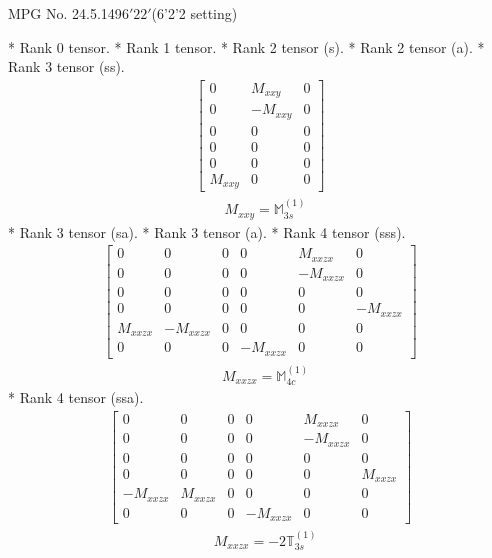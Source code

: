 \documentclass[fleqn,8pt,landscape]{jsarticle}
\begin{document}
\setcounter{MaxMatrixCols}{32}

\renewcommand{\tablename}{Table~}
\renewcommand{\figurename}{Figure~}
\begin{center}
\LARGE
MPG No. 24.5.149\quad$6'22'$\quad(6'2'2 setting)
\end{center}
* Rank 0 tensor.
* Rank 1 tensor.
* Rank 2 tensor (s).
* Rank 2 tensor (a).
* Rank 3 tensor (ss).
\begin{align*}
\begin{bmatrix} 0 & M_{xxy} & 0 \\ 0 & - M_{xxy} & 0 \\ 0 & 0 & 0 \\ 0 & 0 & 0 \\ 0 & 0 & 0 \\ M_{xxy} & 0 & 0 \end{bmatrix}
\end{align*}
\begin{align*}
& M_{xxy} = \mathbb{M}_{3s}^{(1)}
\end{align*}
* Rank 3 tensor (sa).
* Rank 3 tensor (a).
* Rank 4 tensor (sss).
\begin{align*}
\begin{bmatrix} 0 & 0 & 0 & 0 & M_{xxzx} & 0 \\ 0 & 0 & 0 & 0 & - M_{xxzx} & 0 \\ 0 & 0 & 0 & 0 & 0 & 0 \\ 0 & 0 & 0 & 0 & 0 & - M_{xxzx} \\ M_{xxzx} & - M_{xxzx} & 0 & 0 & 0 & 0 \\ 0 & 0 & 0 & - M_{xxzx} & 0 & 0 \end{bmatrix}
\end{align*}
\begin{align*}
& M_{xxzx} = \mathbb{M}_{4c}^{(1)}
\end{align*}
* Rank 4 tensor (ssa).
\begin{align*}
\begin{bmatrix} 0 & 0 & 0 & 0 & M_{xxzx} & 0 \\ 0 & 0 & 0 & 0 & - M_{xxzx} & 0 \\ 0 & 0 & 0 & 0 & 0 & 0 \\ 0 & 0 & 0 & 0 & 0 & M_{xxzx} \\ - M_{xxzx} & M_{xxzx} & 0 & 0 & 0 & 0 \\ 0 & 0 & 0 & - M_{xxzx} & 0 & 0 \end{bmatrix}
\end{align*}
\begin{align*}
& M_{xxzx} = - 2 \mathbb{T}_{3s}^{(1)}
\end{align*}
\end{document}
